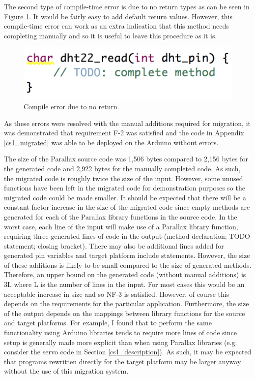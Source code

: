 \documentclass{UoYCSproject}
\begin{document}
The second type of compile-time error is due to no return types as can be seen in Figure \ref{fig:return_type_error}. It would be fairly easy to add default return values. However, this compile-time error can work as an extra indication that this method needs completing manually and so it is useful to leave this procedure as it is.

\begin{figure}[h!]
  \centering
  \includegraphics[width=0.5\linewidth]{graphics/return_type_error.png}
  \caption{Compile error due to no return.}
  \label{fig:return_type_error}
\end{figure}

As these errors were resolved with the manual additions required for migration, it was demonstrated that requirement F-2 was satisfied and the code in Appendix \ref{cs1_migrated} was able to be deployed on the Arduino without errors.

The size of the Parallax source code was 1,506 bytes compared to 2,156 bytes for the generated code and 2,922 bytes for the manually completed code. As such, the migrated code is roughly twice the size of the input. However, some unused functions have been left in the migrated code for demonstration purposes so the migrated code could be made smaller. It should be expected that there will be a constant factor increase in the size of the migrated code since empty methods are generated for each of the Parallax library functions in the source code. In the worst case, each line of the input will make use of a Parallax library function, requiring three generated lines of code in the output (method declaration; TODO statement; closing bracket). There may also be additional lines added for generated pin variables and target platform include statements. However, the size of these additions is likely to be small compared to the size of generated methods. Therefore, an upper bound on the generated code (without manual additions) is 3L where L is the number of lines in the input. For most cases this would be an acceptable increase in size and so NF-3 is satisfied. However, of course this depends on the requirements for the particular application. Furthermore, the size of the output depends on the mappings between library functions for the source and target platforms. For example, I found that to perform the same functionality using Arduino libraries tends to require more lines of code since setup is generally made more explicit than when using Parallax libraries (e.g. consider the servo code in Section \ref{cs1_description}). As such, it may be expected that programs rewritten directly for the target platform may be larger anyway without the use of this migration system.
\end{document}
